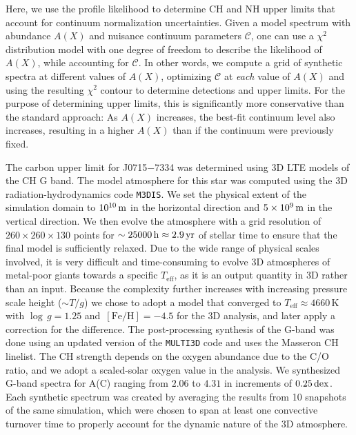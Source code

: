 \documentclass{natureprintstyle}
\newcommand{\unit}[1]{\ensuremath{\mathrm{\,#1}}\xspace}
\newcommand{\feh}{\unit{[Fe/H]}}
\newcommand{\teff}{\ensuremath{T_\mathrm{eff}}\xspace}
\newcommand{\Teff}{\teff}
\newcommand{\logg}{\ensuremath{\log\,g}\xspace}
\newcommand{\umpstar}{J0715$-$7334\xspace}
\begin{document}
Here, we use the profile likelihood\cite{Lampton1976,Feldman1998} to determine CH and NH upper limits that account for continuum normalization uncertainties.
Given a model spectrum with abundance $A(X)$ and nuisance continuum parameters $\mathcal{C}$, one can use a $\chi^2$ distribution model with one degree of freedom to describe the likelihood of $A(X)$, while accounting for $\mathcal{C}$\cite{Wilks1938}. 
In other words, we compute a grid of synthetic spectra at different values of $A(X)$, optimizing $\mathcal{C}$ at \textit{each} value of $A(X)$ and using the resulting $\chi^2$ contour to determine detections and upper limits.
For the purpose of determining upper limits, this is significantly more conservative than the standard approach: As $A(X)$ increases, the best-fit continuum level also increases, resulting in a higher $A(X)$ than if the continuum were previously fixed.

The carbon upper limit for \umpstar was determined using 3D LTE models of the CH G band.
The model atmosphere for this star was computed using the 3D radiation-hydrodynamics code \texttt{M3DIS}\cite{Eitner2024,Eitner2025}. We set the physical extent of the simulation domain to $10^{10}\,{\rm m}$ in the horizontal direction and $5\times10^{9}\,{\rm m}$ in the vertical direction. We then evolve the atmosphere with a grid resolution of $260\times260\times130$ points for $\sim 25000\,{\rm h}\approx 2.9\,{\rm yr}$ of stellar time to ensure that the final model is sufficiently relaxed. Due to the wide range of physical scales involved, it is very difficult and time-consuming to evolve 3D atmospheres of metal-poor giants towards a specific $\Teff$, as it is an output quantity in 3D rather than an input. Because the complexity further increases with increasing pressure scale height ($\sim T/g$) we chose to adopt a model that converged to $\Teff \approx 4660$\,K with $\logg=1.25$ and $\feh=-4.5$ for the 3D analysis, and later apply a correction for the difference. The post-processing synthesis of the G-band was done using an updated version of the \texttt{MULTI3D}\cite{Leenaarts2009,Eitner2024} code and uses the Masseron\cite{Masseron2014} CH linelist.
The CH strength depends on the oxygen abundance due to the C/O ratio, and we adopt a scaled-solar oxygen value in the analysis. We synthesized G-band spectra for A(C) ranging from $2.06$ to $4.31$ in increments of $0.25\,{\rm dex}$. Each synthetic spectrum was created by averaging the results from 10 snapshots of the same simulation, which were chosen to span at least one convective turnover time to properly account for the dynamic nature of the 3D atmosphere.
\end{document}
